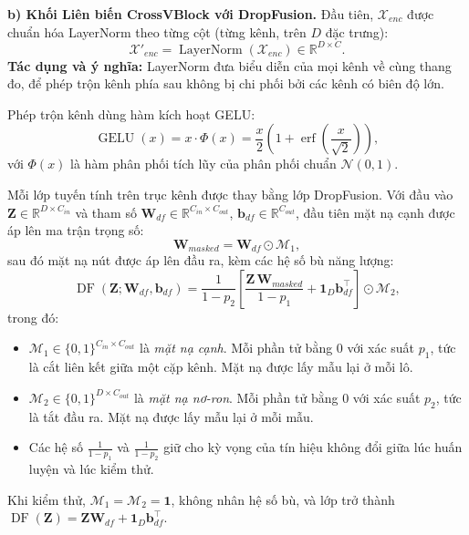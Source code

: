 \documentclass[12pt,a4paper]{report}
\numberwithin{equation}{chapter}
\newcommand{\R}{\mathbb{R}}
\newcommand{\one}{\mathbf{1}}
\newcommand{\LN}{\operatorname{LayerNorm}}
\newcommand{\GELU}{\operatorname{GELU}}
\newcommand{\DF}{\operatorname{DF}}
\begin{document}
\textbf{b) Khối Liên biến CrossVBlock với DropFusion.} Đầu tiên, $\mathcal{X}_{enc}$ được chuẩn hóa LayerNorm theo
từng cột (từng kênh, trên $D$ đặc trưng):
\begin{equation}
\mathcal{X}'_{enc} = \LN(\mathcal{X}_{enc})\in\R^{D\times C}.
\label{eq:ln-cross}
\end{equation}
\textbf{Tác dụng và ý nghĩa:} LayerNorm đưa biểu diễn của mọi kênh về cùng thang đo, để phép trộn kênh phía sau không
bị chi phối bởi các kênh có biên độ lớn.

Phép trộn kênh dùng hàm kích hoạt GELU:
\begin{equation}
\GELU(x) = x\cdot\Phi(x) = \frac{x}{2}\left(1+\operatorname{erf}\left(\frac{x}{\sqrt{2}}\right)\right),
\label{eq:gelu}
\end{equation}
với $\Phi(x)$ là hàm phân phối tích lũy của phân phối chuẩn $\mathcal{N}(0,1)$.

Mỗi lớp tuyến tính trên trục kênh được thay bằng lớp DropFusion. Với đầu vào $\mathbf{Z}\in\R^{D\times C_{in}}$ và tham
số $\mathbf{W}_{df}\in\R^{C_{in}\times C_{out}}$, $\mathbf{b}_{df}\in\R^{C_{out}}$, đầu tiên mặt nạ cạnh được áp lên
ma trận trọng số:
\begin{equation}
\mathbf{W}_{masked} = \mathbf{W}_{df}\odot\mathcal{M}_1 ,
\label{eq:wmasked}
\end{equation}
sau đó mặt nạ nút được áp lên đầu ra, kèm các hệ số bù năng lượng:
\begin{equation}
\DF(\mathbf{Z};\mathbf{W}_{df},\mathbf{b}_{df}) = \frac{1}{1-p_2}\left[\frac{\mathbf{Z}\,\mathbf{W}_{masked}}{1-p_1}
+ \one_D\mathbf{b}_{df}^{\top}\right]\odot\mathcal{M}_2 ,
\label{eq:dropfusion}
\end{equation}
trong đó:
\begin{itemize}
  \item $\mathcal{M}_1\in\{0,1\}^{C_{in}\times C_{out}}$ là \emph{mặt nạ cạnh}. Mỗi phần tử bằng 0 với xác suất $p_1$,
        tức là cắt liên kết giữa một cặp kênh. Mặt nạ được lấy mẫu lại ở mỗi lô.
  \item $\mathcal{M}_2\in\{0,1\}^{D\times C_{out}}$ là \emph{mặt nạ nơ-ron}. Mỗi phần tử bằng 0 với xác suất $p_2$, tức
        là tắt đầu ra. Mặt nạ được lấy mẫu lại ở mỗi mẫu.
  \item Các hệ số $\frac{1}{1-p_1}$ và $\frac{1}{1-p_2}$ giữ cho kỳ vọng của tín hiệu không đổi giữa lúc huấn luyện và
        lúc kiểm thử.
\end{itemize}
Khi kiểm thử, $\mathcal{M}_1=\mathcal{M}_2=\one$, không nhân hệ số bù, và lớp trở thành
$\DF(\mathbf{Z})=\mathbf{Z}\mathbf{W}_{df}+\one_D\mathbf{b}_{df}^{\top}$.
\end{document}
